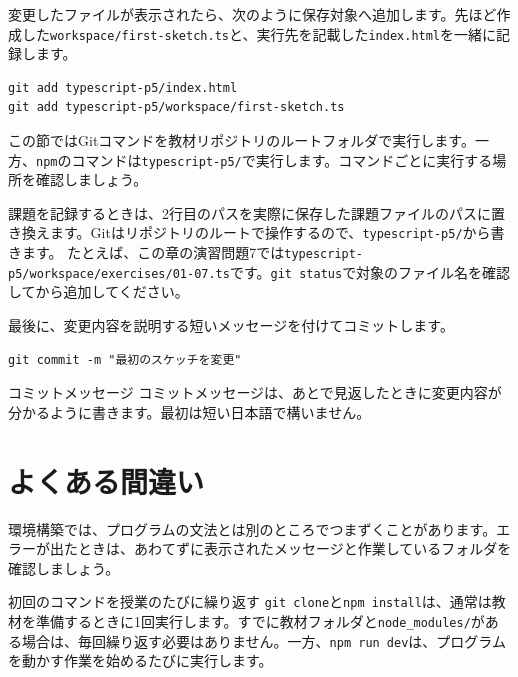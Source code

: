 変更したファイルが表示されたら、次のように保存対象へ追加します。先ほど作成した\texttt{workspace/first-sketch.ts}と、実行先を記載した\texttt{index.html}を一緒に記録します。

\begin{listing}[htbp]
\begin{verbatim}
git add typescript-p5/index.html
git add typescript-p5/workspace/first-sketch.ts
\end{verbatim}
\caption{変更したファイルを保存対象へ追加するコマンド}
\label{lst:chapter01-git-add}
\end{listing}

この節ではGitコマンドを教材リポジトリのルートフォルダで実行します。一方、\texttt{npm}のコマンドは\texttt{typescript-p5/}で実行します。コマンドごとに実行する場所を確認しましょう。

課題を記録するときは、2行目のパスを実際に保存した課題ファイルのパスに置き換えます。Gitはリポジトリのルートで操作するので、\texttt{typescript-p5/}から書きます。
たとえば、この章の演習問題7では\texttt{typescript-p5/workspace/exercises/01-07.ts}です。\texttt{git status}で対象のファイル名を確認してから追加してください。

最後に、変更内容を説明する短いメッセージを付けてコミットします。

\begin{listing}[htbp]
\begin{verbatim}
git commit -m "最初のスケッチを変更"
\end{verbatim}
\caption{Gitで変更を保存するコマンド}
\label{lst:chapter01-git-commit}
\end{listing}

\begin{notebox}{コミットメッセージ}
コミットメッセージは、あとで見返したときに変更内容が分かるように書きます。最初は短い日本語で構いません。
\end{notebox}

\section{よくある間違い}

環境構築では、プログラムの文法とは別のところでつまずくことがあります。エラーが出たときは、あわてずに表示されたメッセージと作業しているフォルダを確認しましょう。

\begin{mistakebox}{初回のコマンドを授業のたびに繰り返す}
\texttt{git clone}と\texttt{npm install}は、通常は教材を準備するときに1回実行します。すでに教材フォルダと\texttt{node\_modules/}がある場合は、毎回繰り返す必要はありません。一方、\texttt{npm run dev}は、プログラムを動かす作業を始めるたびに実行します。
\end{mistakebox}

